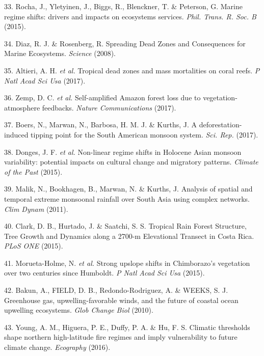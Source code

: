 \documentclass[9pt,]{article}
\begin{document}
\hypertarget{ref-Rocha:2015eea}{}
33. Rocha, J., Yletyinen, J., Biggs, R., Blenckner, T. \& Peterson, G.
Marine regime shifts: drivers and impacts on ecosystems services.
\emph{Phil. Trans. R. Soc. B} (2015).

\hypertarget{ref-Diaz:2008p199}{}
34. Diaz, R. J. \& Rosenberg, R. Spreading Dead Zones and Consequences
for Marine Ecosystems. \emph{Science} (2008).

\hypertarget{ref-Altieri:2017bl}{}
35. Altieri, A. H. \emph{et al.} Tropical dead zones and mass
mortalities on coral reefs. \emph{P Natl Acad Sci Usa} (2017).

\hypertarget{ref-Zemp:2017dr}{}
36. Zemp, D. C. \emph{et al.} Self-amplified Amazon forest loss due to
vegetation-atmosphere feedbacks. \emph{Nature Communications} (2017).

\hypertarget{ref-Boers:2017ej}{}
37. Boers, N., Marwan, N., Barbosa, H. M. J. \& Kurths, J. A
deforestation-induced tipping point for the South American monsoon
system. \emph{Sci. Rep.} (2017).

\hypertarget{ref-Donges:2015fv}{}
38. Donges, J. F. \emph{et al.} Non-linear regime shifts in Holocene
Asian monsoon variability: potential impacts on cultural change and
migratory patterns. \emph{Climate of the Past} (2015).

\hypertarget{ref-Malik:2011bv}{}
39. Malik, N., Bookhagen, B., Marwan, N. \& Kurths, J. Analysis of
spatial and temporal extreme monsoonal rainfall over South Asia using
complex networks. \emph{Clim Dynam} (2011).

\hypertarget{ref-Clark:2015bj}{}
40. Clark, D. B., Hurtado, J. \& Saatchi, S. S. Tropical Rain Forest
Structure, Tree Growth and Dynamics along a 2700-m Elevational Transect
in Costa Rica. \emph{PLoS ONE} (2015).

\hypertarget{ref-MoruetaHolme:2015fy}{}
41. Morueta-Holme, N. \emph{et al.} Strong upslope shifts in
Chimborazo's vegetation over two centuries since Humboldt. \emph{P Natl
Acad Sci Usa} (2015).

\hypertarget{ref-Bakun:2010p5340}{}
42. Bakun, A., FIELD, D. B., Redondo-Rodriguez, A. \& WEEKS, S. J.
Greenhouse gas, upwelling-favorable winds, and the future of coastal
ocean upwelling ecosystems. \emph{Glob Change Biol} (2010).

\hypertarget{ref-Young:2016kj}{}
43. Young, A. M., Higuera, P. E., Duffy, P. A. \& Hu, F. S. Climatic
thresholds shape northern high-latitude fire regimes and imply
vulnerability to future climate change. \emph{Ecography} (2016).
\end{document}
